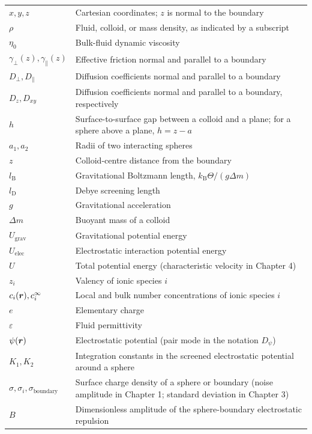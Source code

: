 \begin{longtable}{p{3cm}p{11cm}}
$x,y,z$ & Cartesian coordinates; $z$ is normal to the boundary \\
$\rho$ & Fluid, colloid, or mass density, as indicated by a subscript \\
$\eta_0$ & Bulk-fluid dynamic viscosity \\
$\gamma_\perp(z),\gamma_\parallel(z)$ & Effective friction normal and parallel to a boundary \\
$D_\perp,D_\parallel$ & Diffusion coefficients normal and parallel to a boundary \\
$D_z,D_{xy}$ & Diffusion coefficients normal and parallel to a boundary, respectively \\
$h$ & Surface-to-surface gap between a colloid and a plane; for a sphere above a plane, $h=z-a$ \\
$a_1,a_2$ & Radii of two interacting spheres \\
$z$ & Colloid-centre distance from the boundary \\
$l_\mathrm{B}$ & Gravitational Boltzmann length, $k_\mathrm{B}\Theta/(g\Delta m)$ \\
$l_\mathrm{D}$ & Debye screening length \\
$g$ & Gravitational acceleration \\
$\Delta m$ & Buoyant mass of a colloid \\
$U_\mathrm{grav}$ & Gravitational potential energy \\
$U_\mathrm{elec}$ & Electrostatic interaction potential energy \\
$U$ & Total potential energy (characteristic velocity in Chapter 4) \\
$z_i$ & Valency of ionic species $i$ \\
$c_i(\bm{r}),c_i^\infty$ & Local and bulk number concentrations of ionic species $i$ \\
$e$ & Elementary charge \\
$\varepsilon$ & Fluid permittivity \\
$\psi(\bm{r})$ & Electrostatic potential (pair mode in the notation $D_\psi$) \\
$K_1,K_2$ & Integration constants in the screened electrostatic potential around a sphere \\
$\sigma,\sigma_i,\sigma_\mathrm{boundary}$ & Surface charge density of a sphere or boundary (noise amplitude in Chapter 1; standard deviation in Chapter 3) \\
$B$ & Dimensionless amplitude of the sphere-boundary electrostatic repulsion \\

\end{longtable}
